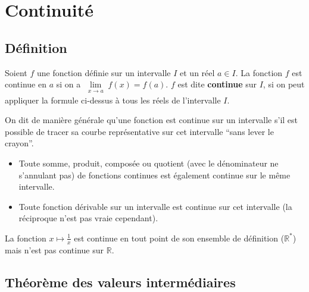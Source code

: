 


	
	\section{Continuité}
	
	\subsection{Définition}
	
	\begin{formula}[Définition]
		Soient $f$ une fonction définie sur un intervalle $I$ et un réel $a \in I$. La fonction $f$ est continue en $a$ si on a $\lim\limits_{\substack{x \rightarrow a}} f(x) = f(a)$.
		\newpar
		$f$ est dite \textbf{continue} sur $I$, si on peut appliquer la formule ci-dessus à tous les réels de l'intervalle $I$.
	\end{formula}
	
	On dit de manière générale qu'une fonction est continue sur un intervalle s'il est possible de tracer sa courbe représentative sur cet intervalle ``sans lever le crayon''.
	
	\begin{formula}
		\begin{itemize}
			\item Toute somme, produit, composée ou quotient (avec le dénominateur ne s'annulant pas) de fonctions continues est également continue sur le même intervalle.
			\item Toute fonction dérivable sur un intervalle est continue sur cet intervalle (la réciproque n'est pas vraie cependant).
		\end{itemize}
	\end{formula}
	
	\begin{tip}[Exemple]
		La fonction $x \mapsto \frac{1}{x}$ est continue en tout point de son ensemble de définition ($\mathbb{R}^{*}$) mais n'est pas continue sur $\mathbb{R}$.
	\end{tip}
	
	\subsection{Théorème des valeurs intermédiaires}
	

